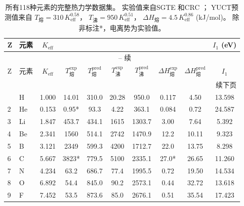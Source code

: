 \documentclass[11pt,a4paper]{article}
\begin{document}
	\setlength{\tabcolsep}{3pt}
	\begin{longtable}{@{}llcccccccc@{}}
		\caption{所有118种元素的完整热力学数据集。  
			实验值来自SGTE \cite{Dinsdale1991} 和CRC \cite{CRC}；  
			YUCT预测值来自 \(T_{\text{熔}} = 310\,K_{\mathrm{eff}}^{0.58}\)，  
			\(T_{\text{沸}} = 950\,K_{\mathrm{eff}}^{0.51}\)，  
			\(\Delta H_{\text{熔}} = 4.5\,K_{\mathrm{eff}}^{0.86}\) (kJ/mol)。  
			除非标注*，电离势为实验值。}
		\label{tab:full_118}\\
		\toprule
		Z & 元素 & \(K_{\mathrm{eff}}\) & 
		\makebox[1.5cm]{\(T_{\text{熔}}^{\text{exp}}\) (K)} & 
		\makebox[1.5cm]{\(T_{\text{熔}}^{\text{pred}}\) (K)} &
		\makebox[1.5cm]{\(T_{\text{沸}}^{\text{exp}}\) (K)} & 
		\makebox[1.5cm]{\(T_{\text{沸}}^{\text{pred}}\) (K)} &
		\makebox[1.5cm]{\(\Delta H_{\text{熔}}^{\text{exp}}\) (kJ/mol)} & 
		\makebox[1.5cm]{\(\Delta H_{\text{熔}}^{\text{pred}}\) (kJ/mol)} &
		\(I_1\) (eV) \\
		\midrule
		\endfirsthead
		\multicolumn{10}{c}{\tablename\ \thetable{} -- 续} \\
		\toprule
		Z & 元素 & \(K_{\mathrm{eff}}\) & \(T_{\text{熔}}^{\text{exp}}\) & \(T_{\text{熔}}^{\text{pred}}\) &
		\(T_{\text{沸}}^{\text{exp}}\) & \(T_{\text{沸}}^{\text{pred}}\) & \(\Delta H_{\text{熔}}^{\text{exp}}\) & \(\Delta H_{\text{熔}}^{\text{pred}}\) & \(I_1\) \\
		\midrule
		\endhead
		\bottomrule
		\multicolumn{10}{r}{续下页} \\
		\endfoot
		\endlastfoot
		1  & H   & 1.000 & 14.01  & 310.0  & 20.28  & 950.0  & 0.117 & 4.50  & 13.598 \\
		2  & He  & 0.153 & 0.95*  & 93.3   & 4.22   & 363.1  & 0.084 & 0.72  & 24.587 \\
		3  & Li  & 1.847 & 453.7  & 434.1  & 1615   & 1303.7 & 3.00  & 7.64  & 5.392 \\
		4  & Be  & 2.341 & 1560   & 514.1  & 2742   & 1470.9 & 12.2  & 10.11 & 9.323 \\
		5  & B   & 3.121 & 2349   & 599.3  & 4200   & 1712.7 & 22.0  & 13.75 & 8.298 \\
		6  & C   & 5.667 & 3823*  & 779.5  & 5100   & 2335.1 & 27.0* & 26.65 & 11.260 \\
		7  & N   & 4.234 & 63.2   & 686.7  & 77.4   & 1995.5 & 0.72  & 19.50 & 14.534 \\
		8  & O   & 6.892 & 54.4   & 845.0  & 90.2   & 2573.1 & 0.44  & 32.72 & 13.618 \\
		9  & F   & 7.452 & 53.5   & 873.6  & 85.0   & 2676.1 & 0.51  & 35.54 & 17.423 \\

\end{longtable}
\end{document}
